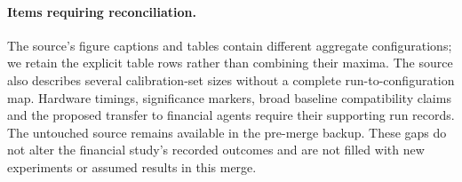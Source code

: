 \paragraph{Items requiring reconciliation.}
The source's figure captions and tables contain different aggregate configurations;
we retain the explicit table rows rather than combining their maxima. The source
also describes several calibration-set sizes without a complete run-to-configuration
map. Hardware timings, significance markers, broad baseline compatibility claims and
the proposed transfer to financial agents require their supporting run records.
The untouched source remains available in the pre-merge backup. These gaps do not
alter the financial study's recorded outcomes and are not filled with new experiments
or assumed results in this merge.
